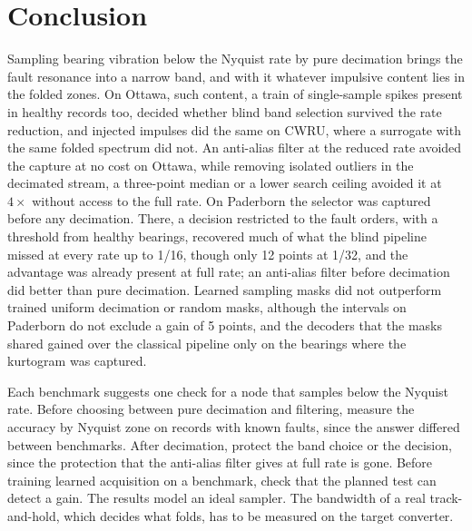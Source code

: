 \section{Conclusion}
\label{sec:conclusion}

Sampling bearing vibration below the Nyquist rate by pure decimation brings the fault resonance into
a narrow band, and with it whatever impulsive content lies in the folded zones. On Ottawa, such
content, a train of single-sample spikes present in healthy records too, decided whether blind band
selection survived the rate reduction, and injected impulses did the same on CWRU, where a surrogate
with the same folded spectrum did not. An anti-alias filter at the reduced rate avoided the capture
at no cost on Ottawa, while removing isolated outliers in the decimated stream, a three-point median
or a lower search ceiling avoided it at $4\times$ without access to the full rate. On Paderborn the
selector was captured before any decimation. There, a decision restricted to the fault orders, with
a threshold from healthy bearings, recovered much of what the blind pipeline missed at every rate up
to 1/16, though only 12 points at 1/32, and the advantage was already present at full rate; an
anti-alias filter before decimation did better than pure decimation. Learned sampling masks did not
outperform trained uniform decimation or random masks, although the intervals on Paderborn do not
exclude a gain of 5 points, and the decoders that the masks shared gained over the classical
pipeline only on the bearings where the kurtogram was captured.

Each benchmark suggests one check for a node that samples below the Nyquist rate. Before choosing
between pure decimation and filtering, measure the accuracy by Nyquist zone on records with known
faults, since the answer differed between benchmarks. After decimation, protect the band choice or
the decision, since the protection that the anti-alias filter gives at full rate is gone. Before
training learned acquisition on a benchmark, check that the planned test can detect a gain. The
results model an ideal sampler. The bandwidth of a real track-and-hold, which decides what folds,
has to be measured on the target converter.
